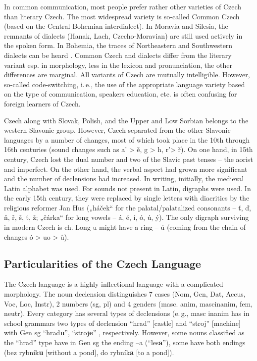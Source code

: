 \begin{multicols}{2}
In common communication, most people prefer rather other varieties of Czech than literary Czech. The most widespread variety is so-called Common Czech (based on the Central Bohemian interdialect). In Moravia and Silesia, the remnants of dialects (Hanak, Lach, Czecho-Moravian) are still used actively in the spoken form. In Bohemia, the traces of Northeastern and Southwestern dialects can be heard \cite{Note3}. Common Czech and dialects differ from the literary variant esp. in morphology, less in the lexicon and pronunciation, the other differences are marginal. All variants of Czech are mutually intelligible. However, so-called code-switching, i.\,e., the use of the appropriate language variety based on the type of communication, speakers education, etc. is often confusing for foreign learners of Czech.

Czech along with Slovak, Polish, and the Upper and Low Sorbian belongs to the western Slavonic group. However, Czech separated from the other Slavonic languages by a number of changes, most of which took place in the 10th through 16th centuries (sound changes such as a’ > ě, g > h, r’> ř). On one hand, in 15th century, Czech lost the dual number and two of the Slavic past tenses – the aorist and imperfect. On the other hand, the verbal aspect had grown more significant and the number of declensions had increased. In writing, initially, the medieval Latin alphabet was used. For sounds not present in Latin, digraphs were used. In the early 15th century, they were replaced by single letters with diacritics by the religious reformer Jan Hus („háček“ for the palatal/palatalized consonants – ť, ď, ň, ř, š, ť, ž; „čárka“ for long vowels – á, é, í, ó, ú, ý). The only digraph surviving in modern Czech is ch. Long u might have a ring – ů (coming from the chain of changes ó > uo > ů).
 
 
\subsection{Particularities of the Czech Language }

The Czech language is a highly inflectional language with a complicated morphology. The noun declension distinguishes 7 cases (Nom, Gen, Dat, Accus, Voc, Loc, Instr), 2 numbers (sg, pl) and 4 genders (masc. anim, mascinanim, fem, neutr). Every category has several types of declensions (e.\,g., masc inanim has in school grammars two types of declension “hrad” {[}castle{]} and “stroj” {[}machine{]} with Gen sg “hrad\textbf{u}”, “stroj\textbf{e}” , respectively. However, some nouns classified as the “hrad” type have in Gen sg the ending –a (“les\textbf{a}”), some have both endings (bez rybník\textbf{u} {[}without a pond{]}, do rybník\textbf{a} {[}to a pond{]}).


\end{multicols}
